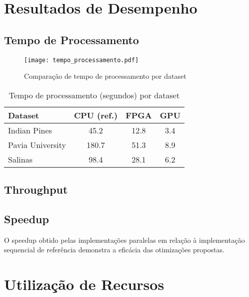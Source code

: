 \section{Resultados de Desempenho}\label{sec:desempenho}

\subsection{Tempo de Processamento}

\begin{figure}[!htb]
\centering
\texttt{[image: tempo\_processamento.pdf]}
\caption{Comparação de tempo de processamento por dataset}
\label{fig:tempo_processamento}
\end{figure}

\begin{table}[!htp]
\caption{Tempo de processamento (segundos) por dataset}
\label{tab:tempo_processamento}
\begin{center}
\begin{tabular}{lccc}
\toprule
\textbf{Dataset} & \textbf{CPU (ref.)} & \textbf{FPGA} & \textbf{GPU} \\
\midrule
Indian Pines & 45.2 & 12.8 & 3.4 \\
Pavia University & 180.7 & 51.3 & 8.9 \\
Salinas & 98.4 & 28.1 & 6.2 \\
\bottomrule
\end{tabular}
\end{center}
\end{table}

\subsection{Throughput}

\subsection{Speedup}
O speedup obtido pelas implementações paralelas em relação à implementação sequencial de referência demonstra a eficácia das otimizações propostas.

\section{Utilização de Recursos}\label{sec:recursos}

